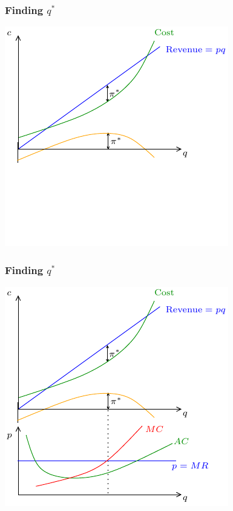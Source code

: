 \documentclass[xcolor=pdftex,dvipsnames]{beamer}
\begin{document}
\begin{frame}
\frametitle{Finding $q^*$}
\begin{center}
\includegraphics{pics/CRProf1}
\end{center}

\end{frame}
\begin{frame}
\frametitle{Finding $q^*$}
\begin{center}
\includegraphics{pics/CRProf2}
\end{center}
\end{frame}
\end{document}
